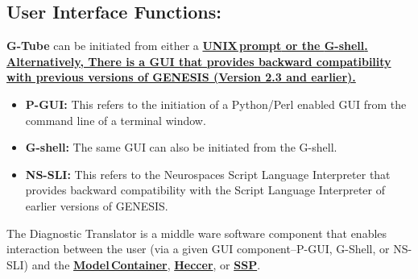 \documentclass[12pt]{article}
\begin{document}
\subsection*{User Interface Functions:} {\bf G-Tube} can be initiated from either a \href{../unix-linux/unix-linux.tex}\bf {\bf UNIX\,prompt} or the \href{../gshell/gshell.tex}{\bf G-shell}. Alternatively, There is a GUI that provides backward compatibility with previous versions of GENESIS (Version 2.3 and earlier).

\begin{itemize}
   \item {\bf P-GUI:} This refers to the initiation of a Python/Perl enabled GUI from the command line of a terminal window.
   \item {\bf G-shell:} The same GUI can also be initiated from the G-shell.
   \item {\bf NS-SLI:} This refers to the Neurospaces Script Language Interpreter that provides backward compatibility with the Script Language Interpreter of earlier versions of GENESIS.
\end{itemize}

The Diagnostic Translator is a middle ware software component that enables interaction between the user (via a given GUI component--P-GUI, G-Shell, or NS-SLI) and the \href{../model-container/model-container.tex}{\bf Model\,Container}, \href{../heccer/heccer.tex}{\bf Heccer}, or \href{../ssp/ssp.tex}{\bf SSP}.
\end{document}
